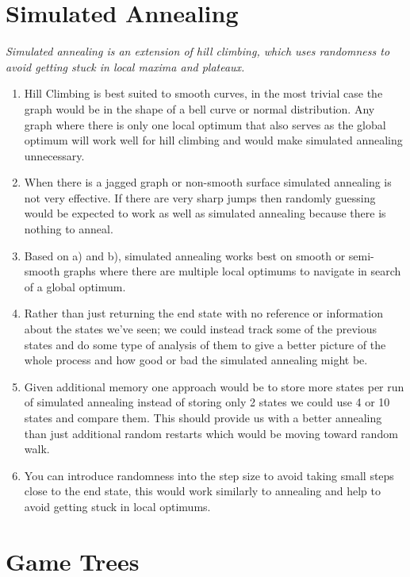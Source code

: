 \documentclass{article}
\begin{document}
\section{Simulated Annealing}
\textit{Simulated annealing is an extension of hill climbing, which uses randomness to avoid getting stuck in local maxima and plateaux.}
\begin{enumerate}[label=(\alph*)]
\item Hill Climbing is best suited to smooth curves, in the most trivial case the graph would be in the shape of a bell curve or normal distribution. Any graph where there is only one local optimum that also serves as the global optimum will work well for hill climbing and would make simulated annealing unnecessary.
\item When there is a jagged graph or non-smooth surface simulated annealing is not very effective. If there are very sharp jumps then randomly guessing would be expected to work as well as simulated annealing because there is nothing to anneal.
\item Based on a) and b), simulated annealing works best on smooth or semi-smooth graphs where there are multiple local optimums to navigate in search of a global optimum.
\item Rather than just returning the end state with no reference or information about the states we’ve seen; we could instead track some of the previous states and do some type of analysis of them to give a better picture of the whole process and how good or bad the simulated annealing might be. 
\item Given additional memory one approach would be to store more states per run of simulated annealing instead of storing only 2 states we could use 4 or 10 states and compare them. This should provide us with a better annealing than just additional random restarts which would be moving toward random walk.
\item You can introduce randomness into the step size to avoid taking small steps close to the end state, this would work similarly to annealing and help to avoid getting stuck in local optimums.
\end{enumerate}

\newpage
\section{Game Trees}
\end{document}
